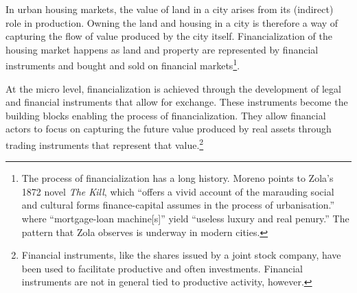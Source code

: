 In urban housing markets, the value of land in a city arises from its (indirect) role in production. Owning the land and housing in a city is therefore a way of capturing the flow of value produced by the city itself. Financialization of the housing market happens as land and property are represented by financial instruments and bought and sold on financial markets\footnote{The process of financialization has a long history. %
Moreno \cite{morenoUrbanProcessFinancialised2014} points to Zola's 1872 novel \textit{The Kill}, which ``offers a vivid account of the marauding social and cultural forms finance-capital assumes in the process of urbanisation.'' where ``mortgage-loan machine[s]'' yield ``useless luxury and real penury.'' The pattern that Zola observes is underway in modern cities.  %
}.

At the micro level, financialization is achieved through the development of legal and financial instruments that allow for exchange. These instruments become the building blocks enabling the process of financialization. They allow financial actors to focus on capturing the future value produced by real assets through trading instruments that represent that value.\footnote{Financial instruments, like the shares issued by a joint stock company, have been used to facilitate productive and often investments. Financial instruments are not in general tied to productive activity, however. }


